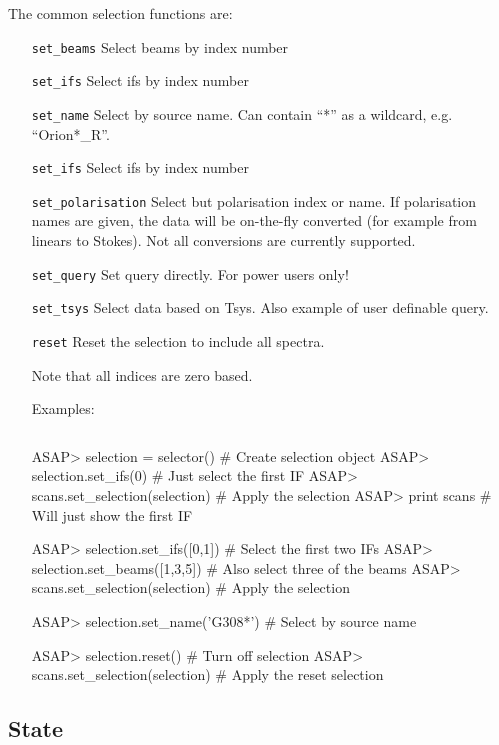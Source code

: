 \documentclass[11pt]{article}
\newcommand{\cmd}[1]{{\tt #1}}
\begin{document}
The common selection functions are:

\begin{itemize}

\item[\cmd{set\_beams}] Select beams by index number
\item[\cmd{set\_ifs}] Select ifs by index number
\item[\cmd{set\_name}] Select by source name. Can contain ``*'' as a
wildcard, e.g. ``Orion*\_R''.
\item[\cmd{set\_ifs}] Select ifs by index number
\item[\cmd{set\_polarisation}] Select but polarisation index or
name. If polarisation names are given, the data will be on-the-fly
converted (for example from linears to Stokes). Not all conversions
are currently supported.
\item[\cmd{set\_query}] Set query directly. For power users only!
\item[\cmd{set\_tsys}] Select data based on Tsys. Also example of user
definable query.
\item[\cmd{reset}] Reset the selection to include all spectra.


Note that all indices are zero based.

Examples:

\begin{verbatim}

\end{verbatim}
  ASAP> selection = selector()         # Create selection object
  ASAP> selection.set_ifs(0)           # Just select the first IF
  ASAP> scans.set_selection(selection) # Apply the selection
  ASAP> print scans                    # Will just show the first IF

  ASAP> selection.set_ifs([0,1])       # Select the first two IFs
  ASAP> selection.set_beams([1,3,5])   # Also select three of the beams
  ASAP> scans.set_selection(selection) # Apply the selection

  ASAP> selection.set_name('G308*')     # Select by source name

  ASAP> selection.reset()              # Turn off selection
  ASAP> scans.set_selection(selection) # Apply the reset selection

\end{itemize}

\subsection{State}
\end{document}
